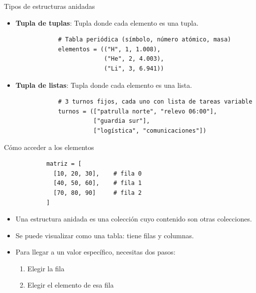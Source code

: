 \documentclass{beamer}
\begin{document}
    \begin{frame}[fragile,t]{Tipos de estructuras anidadas}
        \begin{itemize}
            \item \textbf{Tupla de tuplas}: Tupla donde cada elemento es una tupla.
            \begin{verbatim}
            # Tabla periódica (símbolo, número atómico, masa)
            elementos = (("H", 1, 1.008),
                         ("He", 2, 4.003),
                         ("Li", 3, 6.941))
            \end{verbatim}
            \item \textbf{Tupla de listas}: Tupla donde cada elemento es una lista.
            \begin{verbatim}
            # 3 turnos fijos, cada uno con lista de tareas variable
            turnos = (["patrulla norte", "relevo 06:00"],
                      ["guardia sur"],
                      ["logística", "comunicaciones"])
            \end{verbatim}
        \end{itemize}
    \end{frame}

    \begin{frame}[fragile, t]{Cómo acceder a los elementos}
        \begin{verbatim}
            matriz = [
              [10, 20, 30],    # fila 0
              [40, 50, 60],    # fila 1
              [70, 80, 90]     # fila 2
            ]
            \end{verbatim}
        \begin{itemize}
            \item Una estructura anidada es una colección cuyo contenido son otras colecciones.
            \item Se puede visualizar como una tabla: tiene filas y columnas.
            \item Para llegar a un valor específico, necesitas dos pasos:
            \begin{enumerate}
                \item Elegir la fila
                \item Elegir el elemento de esa fila
            \end{enumerate}
        \end{itemize}
    \end{frame}
\end{document}
